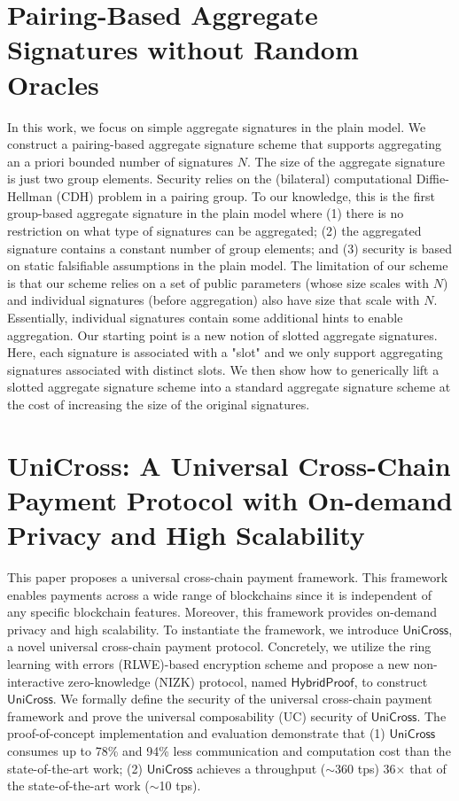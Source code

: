 \documentclass[11pt]{article}
\theoremstyle{definition}
\theoremstyle{remark}
\theoremstyle{plain}
\begin{document}
 \section{\cite{cryptoeprint:2025/1548} Pairing-Based Aggregate Signatures without Random Oracles}
 In this work, we focus on simple aggregate signatures in the plain model. We construct a pairing-based aggregate signature scheme that supports aggregating an a priori bounded number of signatures $N$. The size of the aggregate signature is just two group elements. Security relies on the (bilateral) computational Diffie-Hellman (CDH) problem in a pairing group. To our knowledge, this is the first group-based aggregate signature in the plain model where (1) there is no restriction on what type of signatures can be aggregated; (2) the aggregated signature contains a constant number of group elements; and (3) security is based on static falsifiable assumptions in the plain model. The limitation of our scheme is that our scheme relies on a set of public parameters (whose size scales with $N$) and individual signatures (before aggregation) also have size that scale with $N$. Essentially, individual signatures contain some additional hints to enable aggregation. Our starting point is a new notion of slotted aggregate signatures. Here, each signature is associated with a "slot" and we only support aggregating signatures associated with distinct slots. We then show how to generically lift a slotted aggregate signature scheme into a standard aggregate signature scheme at the cost of increasing the size of the original signatures.
\section{\cite{cryptoeprint:2025/1554} UniCross: A Universal Cross-Chain Payment Protocol with On-demand Privacy and High Scalability}
This paper proposes a universal cross-chain payment framework. This framework enables payments across a wide range of blockchains since it is independent of any specific blockchain features. Moreover, this framework provides on-demand privacy and high scalability. To instantiate the framework, we introduce $\mathsf{UniCross}$, a novel universal cross-chain payment protocol. Concretely, we utilize the ring learning with errors (RLWE)-based encryption scheme and propose a new non-interactive zero-knowledge (NIZK) protocol, named $\mathsf{HybridProof}$, to construct $\mathsf{UniCross}$. We formally define the security of the universal cross-chain payment framework and prove the universal composability (UC) security of $\mathsf{UniCross}$. The proof-of-concept implementation and evaluation demonstrate that (1) $\mathsf{UniCross}$ consumes up to 78\% and 94\% less communication and computation cost than the state-of-the-art work; (2) $\mathsf{UniCross}$ achieves a throughput ($\sim$360 tps) 36$\times$ that of the state-of-the-art work ($\sim$10 tps).
\end{document}
